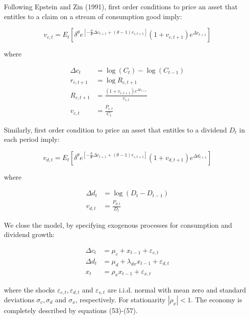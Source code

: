 \documentclass[10pt]{article}
\begin{document}
Following Epstein and Zin (1991), first order conditions to price an asset that entitles to a claim on a stream of consumption good imply:


\begin{equation*}
v_{c, t}=E_{t}\left[\delta^{\theta} e^{\left[-\frac{\theta}{\Psi} \Delta c_{t+1}+(\theta-1) r_{c, t+1}\right]}\left(1+v_{c, t+1}\right) e^{\Delta c_{t+1}}\right] \tag{53}
\end{equation*}


where

$$
\begin{aligned}
\Delta c_{t} & =\log \left(C_{t}\right)-\log \left(C_{t-1}\right) \\
r_{c, t+1} & =\log R_{c, t+1} \\
R_{c, t+1} & =\frac{\left(1+v_{c, t+1}\right) e^{\Delta c_{t+1}}}{v_{c, t}} \\
v_{c, t} & =\frac{P_{c, t}}{C_{t}}
\end{aligned}
$$

Similarly, first order condition to price an asset that entitles to a dividend $D_{t}$ in each period imply:


\begin{equation*}
v_{d, t}=E_{t}\left[\delta^{\theta} e^{\left[-\frac{\theta}{\Psi} \Delta c_{t+1}+(\theta-1) r_{c, t+1}\right]}\left(1+v_{d, t+1}\right) e^{\Delta d_{t+1}}\right] \tag{54}
\end{equation*}


where

$$
\begin{aligned}
\Delta d_{t} & =\log \left(D_{t}-D_{t-1}\right) \\
v_{d, t} & =\frac{P_{d, t}}{D_{t}}
\end{aligned}
$$

We close the model, by specifying exogenous processes for consumption and dividend growth:


\begin{align*}
\Delta c_{t} & =\mu_{c}+x_{t-1}+\varepsilon_{c, t}  \tag{55}\\
\Delta d_{t} & =\mu_{d}+\lambda_{d x} x_{t-1}+\varepsilon_{d, t}  \tag{56}\\
x_{t} & =\rho_{x} x_{t-1}+\varepsilon_{x, t} \tag{57}
\end{align*}


where the shocks $\varepsilon_{c, t}, \varepsilon_{d, t}$ and $\varepsilon_{s, t}$ are i.i.d. normal with mean zero and standard deviations $\sigma_{c}, \sigma_{d}$ and $\sigma_{x}$, respectively. For stationarity $\left|\rho_{x}\right|<1$. The economy is completely described by equations (53)-(57).
\end{document}
